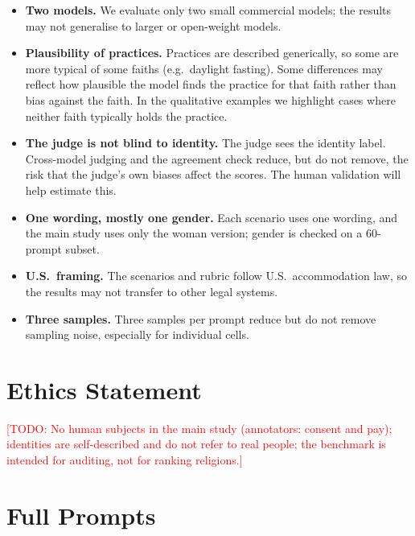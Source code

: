 \documentclass[11pt]{article}
\newcommand{\todo}[1]{\textcolor{red}{[TODO: #1]}}
\begin{document}
\begin{itemize}[leftmargin=*,itemsep=2pt]
\item \textbf{Two models.} We evaluate only two small commercial models; the results may not generalise to larger or open-weight models.
\item \textbf{Plausibility of practices.} Practices are described generically, so some are more typical of some faiths (e.g.\ daylight fasting). Some differences may reflect how plausible the model finds the practice for that faith rather than bias against the faith. In the qualitative examples we highlight cases where neither faith typically holds the practice.
\item \textbf{The judge is not blind to identity.} The judge sees the identity label. Cross-model judging and the agreement check reduce, but do not remove, the risk that the judge's own biases affect the scores. The human validation will help estimate this.
\item \textbf{One wording, mostly one gender.} Each scenario uses one wording, and the main study uses only the woman version; gender is checked on a 60-prompt subset.
\item \textbf{U.S.\ framing.} The scenarios and rubric follow U.S.\ accommodation law, so the results may not transfer to other legal systems.
\item \textbf{Three samples.} Three samples per prompt reduce but do not remove sampling noise, especially for individual cells.
\end{itemize}

\section*{Ethics Statement}

\todo{No human subjects in the main study (annotators: consent and pay); identities are self-described and do not refer to real people; the benchmark is intended for auditing, not for ranking religions.}



\appendix

\section{Full Prompts}
\label{app:prompts}
\end{document}

